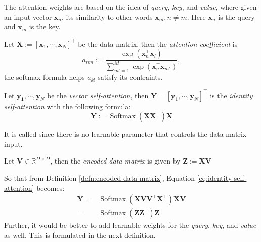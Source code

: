 The attention weights are based on the idea of \textit{query}, \textit{key}, and \textit{value}, where given an input vector $\mathbf{x}_n$, its similarity to other words $\mathbf{x}_m,n\neq m$. Here $\mathbf{x}_n$ is the query and $\mathbf{x}_m$ is the key.
\begin{defn}
    Let $\mathbf{X}:=[\mathbf{x}_1,\cdots,\mathbf{x}_N]^{\top}$ be the data matrix, then the \textit{attention coefficient} is
    \begin{equation}
        a_{nm}:=\frac{\exp(\mathbf{x}_n^{\top}\mathbf{x}_l)}{\displaystyle\sum_{m'=1}^{M}\exp(\mathbf{x}_n^{\top}\mathbf{x}_{m'})},
    \end{equation}
    the softmax formula helps $a_{kl}$ satisfy its contraints.
\end{defn}
\begin{defn}
    Let $\mathbf{y_1},\cdots,\mathbf{y}_N$ be the \textit{vector self-attention}, then $\mathbf{Y}=[\mathbf{y}_1,\cdots,\mathbf{y}_N]^{\top}$ is the \textit{identity self-attention} with the following formula:
    \begin{equation}\label{eq:identity-self-attention}
        \mathbf{Y}:=\operatorname{Softmax}(\mathbf{X}\mathbf{X}^{\top})\mathbf{X}
    \end{equation}
\end{defn}
\begin{remark}
    It is called  since there is no learnable parameter that controls the data matrix input.
\end{remark}
\begin{defn}\label{defn:encoded-data-matrix}
    Let $\mathbf{V}\in\mathbb{R}^{D\times D}$, then the \textit{encoded data matrix} is given by $\mathbf{Z}:=\mathbf{X}\mathbf{V}$
\end{defn}
So that from Definition \ref{defn:encoded-data-matrix}, Equation \ref{eq:identity-self-attention} becomes:
\begin{align}
    \mathbf{Y}=&\operatorname{Softmax}(\mathbf{X}\mathbf{V}\mathbf{V}^{\top}\mathbf{X}^{\top})\mathbf{X}\mathbf{V}\\
    =&\operatorname{Softmax}(\mathbf{Z}\mathbf{Z}^{\top})\mathbf{Z}
\end{align}
Further, it would be better to add learnable weights for the \textit{query}, \textit{key}, and \textit{value} as well. This is formulated in the next definition.
